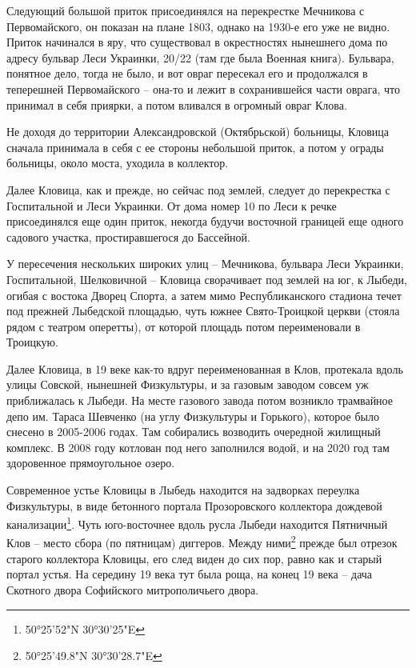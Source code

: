 Следующий большой приток присоединялся на перекрестке Мечникова с Первомайского, он показан на плане 1803, однако на 1930-е его уже не видно. Приток начинался в яру, что существовал в окрестностях нынешнего дома по адресу бульвар Леси Украинки, 20/22 (там где была Военная книга). Бульвара, понятное дело, тогда не было, и вот овраг пересекал его и продолжался в теперешней Первомайского – она-то и лежит в сохранившейся части оврага, что принимал в себя приярки, а потом вливался в огромный овраг Клова.

Не доходя до территории Александровской (Октябрьской) больницы, Кловица сначала принимала в себя с ее стороны небольшой приток, а потом у ограды больницы, около моста, уходила в коллектор.

Далее Кловица, как и прежде, но сейчас под землей, следует до перекрестка с Госпитальной и Леси Украинки. От дома номер 10 по Леси к речке присоединялся еще один приток, некогда будучи восточной границей еще одного садового участка, простиравшегося до Бассейной.

У пересечения нескольких широких улиц – Мечникова, бульвара Леси Украинки, Госпитальной, Шелковичной – Кловица сворачивает под землей на юг, к Лыбеди, огибая с востока Дворец Спорта, а затем мимо Республиканского стадиона течет под прежней Лыбедской площадью, чуть южнее Свято-Троицкой церкви (стояла рядом с театром оперетты), от которой площадь потом переименовали в Троицкую.

Далее Кловица, в 19 веке как-то вдруг переименованная в Клов, протекала вдоль улицы Совской, нынешней Физкультуры, и за газовым заводом совсем уж приближалась к Лыбеди. На месте газового завода потом возникло трамвайное депо им. Тараса Шевченко (на углу Физкультуры и Горького), которое было снесено в 2005-2006 годах. Там собирались возводить очередной жилищный комплекс. В 2008 году котлован под него заполнился водой, и на 2020 год там здоровенное прямоугольное озеро.

Современное устье Кловицы в Лыбедь находится на задворках переулка Физкультуры, в виде бетонного портала Прозоровского коллектора дождевой канализации\footnote{50°25'52"N 30°30'25"E}. Чуть юго-восточнее вдоль русла Лыбеди находится Пятничный Клов – место сбора (по пятницам) диггеров. Между ними\footnote{50°25'49.8"N 30°30'28.7"E} прежде был отрезок старого коллектора Кловицы, его след виден до сих пор, равно как и старый портал устья. На середину 19 века тут была роща, на конец 19 века – дача Скотного двора Софийского митрополичьего двора.

